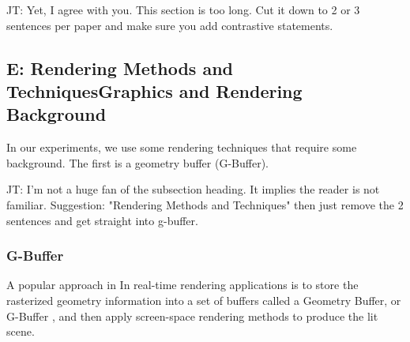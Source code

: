 \documentclass[10pt,twocolumn,letterpaper]{article}
\newcommand{\tompson}[1]{{\color{green} JT: #1}}
\newcommand{\edit}[1]{{\color{red} E: #1}}
\begin{document}

\tompson{Yet, I agree with you. This section is too long. Cut it down to 2 or 3 sentences per paper and make sure you add contrastive statements.}

\subsection{\edit{Rendering Methods and Techniques}Graphics and Rendering Background}

In our experiments, we use some rendering techniques that require some background.  The first is a geometry buffer (G-Buffer).

\tompson{I'm not a huge fan of the subsection heading. It implies the reader is not familiar. Suggestion: "Rendering Methods and Techniques" then just remove the 2 sentences and get straight into g-buffer.}

\subsubsection{G-Buffer}

A popular approach in In real-time rendering applications is to store the rasterized geometry information into a set of buffers called a Geometry Buffer, or G-Buffer \cite{Saito:1990:CRS:97879.97901}, and then apply screen-space rendering methods to produce the lit scene.
\end{document}
